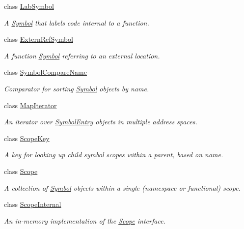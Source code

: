 \begin{DoxyCompactItemize}
class \mbox{\hyperlink{class_lab_symbol}{Lab\+Symbol}}
\begin{DoxyCompactList}\small\item\em A \mbox{\hyperlink{class_symbol}{Symbol}} that labels code internal to a function. \end{DoxyCompactList}\item 
class \mbox{\hyperlink{class_extern_ref_symbol}{Extern\+Ref\+Symbol}}
\begin{DoxyCompactList}\small\item\em A function \mbox{\hyperlink{class_symbol}{Symbol}} referring to an external location. \end{DoxyCompactList}\item 
class \mbox{\hyperlink{class_symbol_compare_name}{Symbol\+Compare\+Name}}
\begin{DoxyCompactList}\small\item\em Comparator for sorting \mbox{\hyperlink{class_symbol}{Symbol}} objects by name. \end{DoxyCompactList}\item 
class \mbox{\hyperlink{class_map_iterator}{Map\+Iterator}}
\begin{DoxyCompactList}\small\item\em An iterator over \mbox{\hyperlink{class_symbol_entry}{Symbol\+Entry}} objects in multiple address spaces. \end{DoxyCompactList}\item 
class \mbox{\hyperlink{class_scope_key}{Scope\+Key}}
\begin{DoxyCompactList}\small\item\em A key for looking up child symbol scopes within a parent, based on name. \end{DoxyCompactList}\item 
class \mbox{\hyperlink{class_scope}{Scope}}
\begin{DoxyCompactList}\small\item\em A collection of \mbox{\hyperlink{class_symbol}{Symbol}} objects within a single (namespace or functional) scope. \end{DoxyCompactList}\item 
class \mbox{\hyperlink{class_scope_internal}{Scope\+Internal}}
\begin{DoxyCompactList}\small\item\em An in-\/memory implementation of the \mbox{\hyperlink{class_scope}{Scope}} interface. \end{DoxyCompactList}\item 

\end{DoxyCompactItemize}
